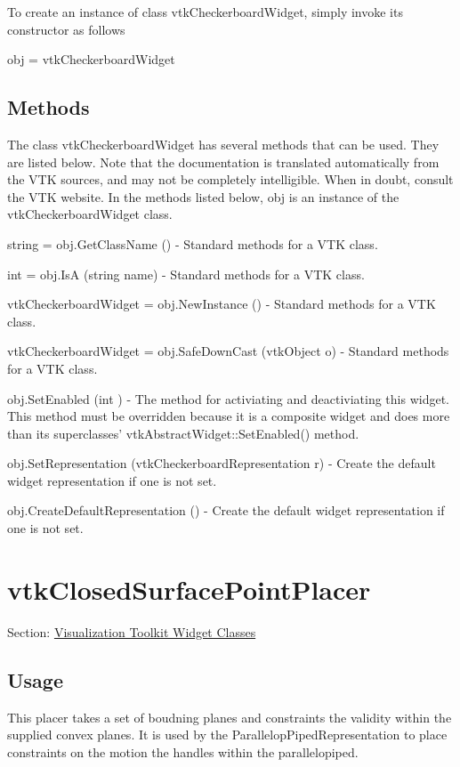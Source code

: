 To create an instance of class vtk\-Checkerboard\-Widget, simply invoke its constructor as follows \begin{DoxyVerb}  obj = vtkCheckerboardWidget
\end{DoxyVerb}
 \hypertarget{vtkwidgets_vtkxyplotwidget_Methods}{}\subsection{Methods}\label{vtkwidgets_vtkxyplotwidget_Methods}
The class vtk\-Checkerboard\-Widget has several methods that can be used. They are listed below. Note that the documentation is translated automatically from the V\-T\-K sources, and may not be completely intelligible. When in doubt, consult the V\-T\-K website. In the methods listed below, {\ttfamily obj} is an instance of the vtk\-Checkerboard\-Widget class. 
\begin{DoxyItemize}
\item {\ttfamily string = obj.\-Get\-Class\-Name ()} -\/ Standard methods for a V\-T\-K class.  
\item {\ttfamily int = obj.\-Is\-A (string name)} -\/ Standard methods for a V\-T\-K class.  
\item {\ttfamily vtk\-Checkerboard\-Widget = obj.\-New\-Instance ()} -\/ Standard methods for a V\-T\-K class.  
\item {\ttfamily vtk\-Checkerboard\-Widget = obj.\-Safe\-Down\-Cast (vtk\-Object o)} -\/ Standard methods for a V\-T\-K class.  
\item {\ttfamily obj.\-Set\-Enabled (int )} -\/ The method for activiating and deactiviating this widget. This method must be overridden because it is a composite widget and does more than its superclasses' vtk\-Abstract\-Widget\-::\-Set\-Enabled() method.  
\item {\ttfamily obj.\-Set\-Representation (vtk\-Checkerboard\-Representation r)} -\/ Create the default widget representation if one is not set.  
\item {\ttfamily obj.\-Create\-Default\-Representation ()} -\/ Create the default widget representation if one is not set.  
\end{DoxyItemize}\hypertarget{vtkwidgets_vtkclosedsurfacepointplacer}{}\section{vtk\-Closed\-Surface\-Point\-Placer}\label{vtkwidgets_vtkclosedsurfacepointplacer}
Section\-: \hyperlink{sec_vtkwidgets}{Visualization Toolkit Widget Classes} \hypertarget{vtkwidgets_vtkxyplotwidget_Usage}{}\subsection{Usage}\label{vtkwidgets_vtkxyplotwidget_Usage}
This placer takes a set of boudning planes and constraints the validity within the supplied convex planes. It is used by the Parallelop\-Piped\-Representation to place constraints on the motion the handles within the parallelopiped.

